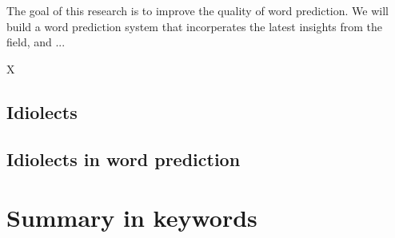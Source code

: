 \documentclass[12pt]{article}
\begin{document}
The goal of this research is to improve the quality of word prediction. We will build a word prediction system that incorperates the latest insights from the field, and ...

X


\subsection{Idiolects} \label{idiolects}


\subsection{Idiolects in word prediction} \label{link}


\section{Summary in keywords}
\end{document}
